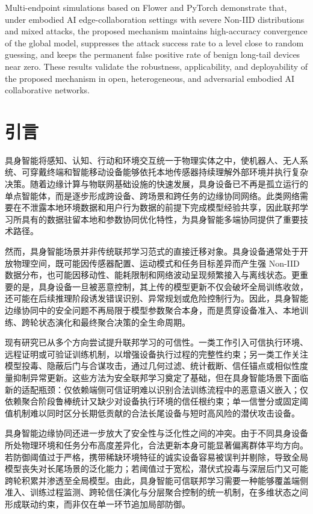 \documentclass[11pt, a4paper, UTF8, fontset=fandol]{ctexart}
\begin{document}
Multi-endpoint simulations based on Flower and PyTorch demonstrate that, under embodied AI edge-collaboration settings with severe Non-IID distributions and mixed attacks, the proposed mechanism maintains high-accuracy convergence of the global model, suppresses the attack success rate to a level close to random guessing, and keeps the permanent false positive rate of benign long-tail devices near zero. These results validate the robustness, applicability, and deployability of the proposed mechanism in open, heterogeneous, and adversarial embodied AI collaborative networks.

\section{引言}
具身智能将感知、认知、行动和环境交互统一于物理实体之中，使机器人、无人系统、可穿戴终端和智能移动设备能够依托本地传感器持续理解外部环境并执行复杂决策。随着边缘计算与物联网基础设施的快速发展，具身设备已不再是孤立运行的单点智能体，而是逐步形成跨设备、跨场景和跨任务的边缘协同网络。此类网络需要在不泄露本地环境数据和用户行为数据的前提下完成模型经验共享，因此联邦学习所具有的数据驻留本地和参数协同优化特性，为具身智能多端协同提供了重要技术路径\cite{kairouz2021flsurvey,mcmahan2017fedavg}。

然而，具身智能场景并非传统联邦学习范式的直接迁移对象。具身设备通常处于开放物理空间，既可能因传感器配置、运动模式和任务目标差异而产生强 Non-IID 数据分布，也可能因移动性、能耗限制和网络波动呈现频繁接入与离线状态。更重要的是，具身设备一旦被恶意控制，其上传的模型更新不仅会破坏全局训练收敛，还可能在后续推理阶段诱发错误识别、异常规划或危险控制行为。因此，具身智能边缘协同中的安全问题不再局限于模型参数聚合本身，而是贯穿设备准入、本地训练、跨轮状态演化和最终聚合决策的全生命周期。

现有研究已从多个方向尝试提升联邦学习的可信性。一类工作引入可信执行环境、远程证明或可验证训练机制，以增强设备执行过程的完整性约束\cite{lu2025tmt,zhang2025rppfl,r1_tee_integrity}；另一类工作关注模型投毒、隐蔽后门与合谋攻击，通过几何过滤、统计截断、信任锚点或相似性度量抑制异常更新\cite{bagdasaryan2020backdoor,wang2019neuralcleanse,blanchard2017krum,yin2018byzantine,cao2021fltrust,fung2020foolsgold}。这些方法为安全联邦学习奠定了基础，但在具身智能场景下面临新的适配瓶颈：仅依赖端侧可信证明难以识别合法训练流程中的恶意语义嵌入；仅依赖聚合阶段鲁棒统计又缺少对设备执行环境的信任根约束；单一信誉分或固定阈值机制难以同时区分长期低贡献的合法长尾设备与短时高风险的潜伏攻击设备。

具身智能边缘协同还进一步放大了安全性与泛化性之间的冲突。由于不同具身设备所处物理环境和任务分布高度差异化，合法更新本身可能显著偏离群体平均方向。若防御阈值过于严格，携带稀缺环境特征的诚实设备容易被误判并剔除，导致全局模型丧失对长尾场景的泛化能力；若阈值过于宽松，潜伏式投毒与深层后门又可能跨轮积累并渗透至全局模型。由此，具身智能可信联邦学习需要一种能够覆盖端侧准入、训练过程监测、跨轮信任演化与分层聚合控制的统一机制，在多维状态之间形成联动约束，而非仅在单一环节追加局部防御。
\end{document}
